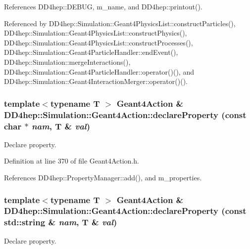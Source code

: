 References DD4hep::DEBUG, m\_\-name, and DD4hep::printout().

Referenced by DD4hep::Simulation::Geant4PhysicsList::constructParticles(), DD4hep::Simulation::Geant4PhysicsList::constructPhysics(), DD4hep::Simulation::Geant4PhysicsList::constructProcesses(), DD4hep::Simulation::Geant4ParticleHandler::endEvent(), DD4hep::Simulation::mergeInteractions(), DD4hep::Simulation::Geant4ParticleHandler::operator()(), and DD4hep::Simulation::Geant4InteractionMerger::operator()().\hypertarget{class_d_d4hep_1_1_simulation_1_1_geant4_action_abd5a683c0c6511aabb8ed0502ad25ee6}{
\subsubsection[{declareProperty}]{\setlength{\rightskip}{0pt plus 5cm}template$<$typename T $>$ {\bf Geant4Action} \& DD4hep::Simulation::Geant4Action::declareProperty (const char $\ast$ {\em nam}, \/  {\bf T} \& {\em val})}}
\label{class_d_d4hep_1_1_simulation_1_1_geant4_action_abd5a683c0c6511aabb8ed0502ad25ee6}


Declare property. 

Definition at line 370 of file Geant4Action.h.

References DD4hep::PropertyManager::add(), and m\_\-properties.\hypertarget{class_d_d4hep_1_1_simulation_1_1_geant4_action_acef2b66c2126c84bec80d8f57ceb9789}{
\subsubsection[{declareProperty}]{\setlength{\rightskip}{0pt plus 5cm}template$<$typename T $>$ {\bf Geant4Action} \& DD4hep::Simulation::Geant4Action::declareProperty (const std::string \& {\em nam}, \/  {\bf T} \& {\em val})}}
\label{class_d_d4hep_1_1_simulation_1_1_geant4_action_acef2b66c2126c84bec80d8f57ceb9789}


Declare property. 

